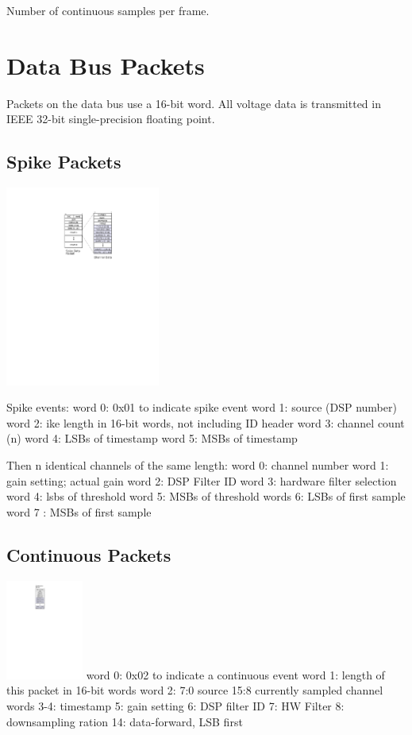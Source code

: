 Number of continuous samples per frame.


\section{Data Bus Packets}
Packets on the data bus use a 16-bit word. All voltage data is transmitted in IEEE 32-bit single-precision floating point. 


\subsection{Spike Packets}
\includegraphics[width=2in]{spike.svg}

Spike events:
word 0: 0x01 to indicate spike event
word 1: source (DSP number)
word 2: ike length in 16-bit words, not including ID header
word 3: channel count (n)
word 4: LSBs of timestamp
word 5: MSBs of timestamp

Then n identical channels of the same length:
word 0: channel number
word 1: gain setting; actual gain
word 2: DSP Filter ID
word 3: hardware filter selection
word 4: lsbs of threshold
word 5: MSBs of threshold
words 6: LSBs of first sample
word 7 : MSBs of first sample

\subsection{Continuous Packets}
\includegraphics[width=1in]{cont.svg}
word 0: 0x02 to indicate a continuous event
word 1: length of this packet in 16-bit words
word 2: 
   7:0 source
  15:8 currently sampled channel
words 3-4: timestamp
5: gain setting
6: DSP filter ID
7: HW Filter
8: downsampling ration
14: data-forward, LSB first



